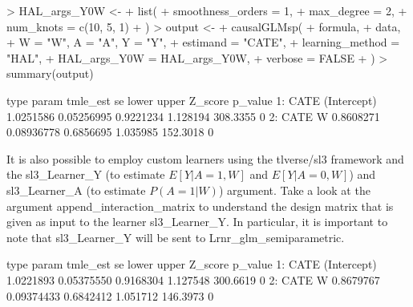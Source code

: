 \documentclass{article}
\begin{document}
\begin{Schunk}
\begin{Sinput}
> HAL_args_Y0W <-
+   list(
+     smoothness_orders = 1,
+     max_degree = 2,
+     num_knots = c(10, 5, 1)
+   )
> output <-
+   causalGLMsp(
+     formula,
+     data,
+     W = "W", A = "A", Y = "Y",
+     estimand = "CATE",
+     learning_method = "HAL",
+     HAL_args_Y0W = HAL_args_Y0W,
+     verbose = FALSE
+   )
> summary(output) 
\end{Sinput}
\begin{Soutput}
   type       param  tmle_est         se     lower    upper  Z_score p_value
1: CATE (Intercept) 1.0251586 0.05256995 0.9221234 1.128194 308.3355       0
2: CATE           W 0.8608271 0.08936778 0.6856695 1.035985 152.3018       0
\end{Soutput}
\end{Schunk}

It is also possible to employ custom learners using the tlverse/sl3 framework and the sl3\_Learner\_Y (to estimate $E[Y|A=1,W]$ and $E[Y|A=0,W]$) and sl3\_Learner\_A (to estimate $P(A=1|W)$) argument.
Take a look at the argument append\_interaction\_matrix to understand the design matrix that is given as input to the learner sl3\_Learner\_Y. In particular, it is important to note that sl3\_Learner\_Y will be sent to Lrnr\_glm\_semiparametric.

\begin{Schunk}
\begin{Soutput}
   type       param  tmle_est         se     lower    upper  Z_score p_value
1: CATE (Intercept) 1.0221893 0.05375550 0.9168304 1.127548 300.6619       0
2: CATE           W 0.8679767 0.09374433 0.6842412 1.051712 146.3973       0
\end{Soutput}
\end{Schunk}
 
\end{document}
